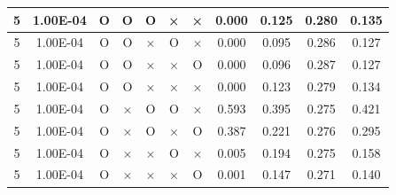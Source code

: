 \documentclass[11pt]{article}
\begin{document}
\begin{longtable}[h]{|r|r|l|l|l|l|l|r|r|l|r|}
\multicolumn{1}{|c|}{5} & \multicolumn{1}{c|}{1.00E-04} & \multicolumn{1}{c|}{O} & \multicolumn{1}{c|}{O} & \multicolumn{1}{c|}{O} & \multicolumn{1}{c|}{×} & \multicolumn{1}{c|}{×} & \multicolumn{1}{c|}{0.000} & \multicolumn{1}{c|}{0.125} & \multicolumn{1}{c|}{0.280} & \multicolumn{1}{c|}{0.135} \\ \hline
\multicolumn{1}{|c|}{5} & \multicolumn{1}{c|}{1.00E-04} & \multicolumn{1}{c|}{O} & \multicolumn{1}{c|}{O} & \multicolumn{1}{c|}{×} & \multicolumn{1}{c|}{O} & \multicolumn{1}{c|}{×} & \multicolumn{1}{c|}{0.000} & \multicolumn{1}{c|}{0.095} & \multicolumn{1}{c|}{0.286} & \multicolumn{1}{c|}{0.127} \\ \hline
\multicolumn{1}{|c|}{5} & \multicolumn{1}{c|}{1.00E-04} & \multicolumn{1}{c|}{O} & \multicolumn{1}{c|}{O} & \multicolumn{1}{c|}{×} & \multicolumn{1}{c|}{×} & \multicolumn{1}{c|}{O} & \multicolumn{1}{c|}{0.000} & \multicolumn{1}{c|}{0.096} & \multicolumn{1}{c|}{0.287} & \multicolumn{1}{c|}{0.127} \\ \hline
\multicolumn{1}{|c|}{5} & \multicolumn{1}{c|}{1.00E-04} & \multicolumn{1}{c|}{O} & \multicolumn{1}{c|}{O} & \multicolumn{1}{c|}{×} & \multicolumn{1}{c|}{×} & \multicolumn{1}{c|}{×} & \multicolumn{1}{c|}{0.000} & \multicolumn{1}{c|}{0.123} & \multicolumn{1}{c|}{0.279} & \multicolumn{1}{c|}{0.134} \\ \hline
\multicolumn{1}{|c|}{5} & \multicolumn{1}{c|}{1.00E-04} & \multicolumn{1}{c|}{O} & \multicolumn{1}{c|}{×} & \multicolumn{1}{c|}{O} & \multicolumn{1}{c|}{O} & \multicolumn{1}{c|}{×} & \multicolumn{1}{c|}{0.593} & \multicolumn{1}{c|}{0.395} & \multicolumn{1}{c|}{0.275} & \multicolumn{1}{c|}{0.421} \\ \hline
\multicolumn{1}{|c|}{5} & \multicolumn{1}{c|}{1.00E-04} & \multicolumn{1}{c|}{O} & \multicolumn{1}{c|}{×} & \multicolumn{1}{c|}{O} & \multicolumn{1}{c|}{×} & \multicolumn{1}{c|}{O} & \multicolumn{1}{c|}{0.387} & \multicolumn{1}{c|}{0.221} & \multicolumn{1}{c|}{0.276} & \multicolumn{1}{c|}{0.295} \\ \hline
\multicolumn{1}{|c|}{5} & \multicolumn{1}{c|}{1.00E-04} & \multicolumn{1}{c|}{O} & \multicolumn{1}{c|}{×} & \multicolumn{1}{c|}{×} & \multicolumn{1}{c|}{O} & \multicolumn{1}{c|}{×} & \multicolumn{1}{c|}{0.005} & \multicolumn{1}{c|}{0.194} & \multicolumn{1}{c|}{0.275} & \multicolumn{1}{c|}{0.158} \\ \hline
\multicolumn{1}{|c|}{5} & \multicolumn{1}{c|}{1.00E-04} & \multicolumn{1}{c|}{O} & \multicolumn{1}{c|}{×} & \multicolumn{1}{c|}{×} & \multicolumn{1}{c|}{×} & \multicolumn{1}{c|}{O} & \multicolumn{1}{c|}{0.001} & \multicolumn{1}{c|}{0.147} & \multicolumn{1}{c|}{0.271} & \multicolumn{1}{c|}{0.140} \\ \hline

\end{longtable}
\end{document}
